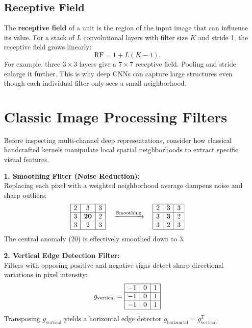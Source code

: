 \subsection{Receptive Field}
The \textbf{receptive field} of a unit is the region of the input image that can influence its value. For a stack of $L$ convolutional layers with filter size $K$ and stride 1, the receptive field grows linearly:
\[ \text{RF} = 1 + L(K-1). \]
For example, three $3 \times 3$ layers give a $7 \times 7$ receptive field. Pooling and stride enlarge it further. This is why deep CNNs can capture large structures even though each individual filter only sees a small neighborhood.

\section{Classic Image Processing Filters}

Before inspecting multi-channel deep representations, consider how classical handcrafted kernels manipulate local spatial neighborhoods to extract specific visual features.

\begin{examplebox}
\textbf{1. Smoothing Filter (Noise Reduction):}\\
Replacing each pixel with a weighted neighborhood average dampens noise and sharp outliers:
\[
\begin{array}{|c|c|c|}
\hline
2 & 3 & 3 \\ \hline
3 & \mathbf{20} & 2 \\ \hline
3 & 2 & 3 \\ \hline
\end{array}
\quad \xrightarrow{\text{Smoothing}} \quad
\begin{array}{|c|c|c|}
\hline
2 & 3 & 3 \\ \hline
3 & \mathbf{3} & 2 \\ \hline
3 & 2 & 3 \\ \hline
\end{array}
\]
The central anomaly ($20$) is effectively smoothed down to $3$.
\end{examplebox}

\begin{examplebox}
\textbf{2. Vertical Edge Detection Filter:}\\
Filters with opposing positive and negative signs detect sharp directional variations in pixel intensity:
\[
g_{\text{vertical}} = \begin{array}{|c|c|c|}
\hline
-1 & 0 & 1 \\ \hline
-1 & 0 & 1 \\ \hline
-1 & 0 & 1 \\ \hline
\end{array}
\]
Transposing $g_{\text{vertical}}$ yields a horizontal edge detector $g_{\text{horizontal}} = g_{\text{vertical}}^T$.
\end{examplebox}

